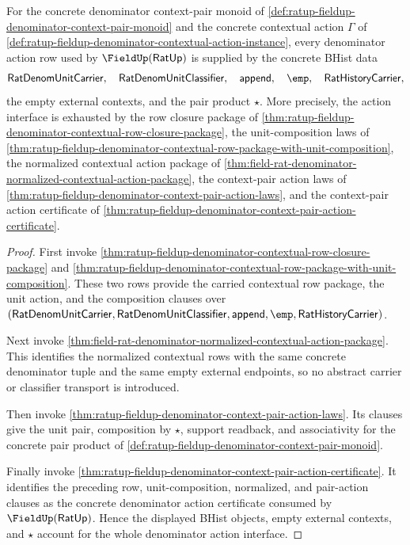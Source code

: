 \begin{theorem}
\label{thm:ratup-fieldup-denominator-context-pair-normalized-row-exhaustion}
For the concrete denominator context-pair monoid of
\autoref{def:ratup-fieldup-denominator-context-pair-monoid} and the concrete
contextual action $\Gamma$ of
\autoref{def:ratup-fieldup-denominator-contextual-action-instance}, every
denominator action row used by $\FieldUp(\mathsf{RatUp})$ is supplied by the
concrete BHist data
$$
\mathsf{RatDenomUnitCarrier},\quad
\mathsf{RatDenomUnitClassifier},\quad
\mathsf{append},\quad
\emp,\quad
\mathsf{RatHistoryCarrier},
$$
the empty external contexts, and the pair product $\star$. More precisely, the
action interface is exhausted by the row closure package of
\autoref{thm:ratup-fieldup-denominator-contextual-row-closure-package}, the
unit-composition laws of
\autoref{thm:ratup-fieldup-denominator-contextual-row-package-with-unit-composition},
the normalized contextual action package of
\autoref{thm:field-rat-denominator-normalized-contextual-action-package}, the
context-pair action laws of
\autoref{thm:ratup-fieldup-denominator-context-pair-action-laws}, and the
context-pair action certificate of
\autoref{thm:ratup-fieldup-denominator-context-pair-action-certificate}.
\end{theorem}
\begin{proof}
First invoke
\autoref{thm:ratup-fieldup-denominator-contextual-row-closure-package} and
\autoref{thm:ratup-fieldup-denominator-contextual-row-package-with-unit-composition}.
These two rows provide the carried contextual row package, the unit action, and
the composition clauses over
$(\mathsf{RatDenomUnitCarrier},\mathsf{RatDenomUnitClassifier},
\mathsf{append},\emp,\mathsf{RatHistoryCarrier})$.

Next invoke
\autoref{thm:field-rat-denominator-normalized-contextual-action-package}. This
identifies the normalized contextual rows with the same concrete denominator
tuple and the same empty external endpoints, so no abstract carrier or
classifier transport is introduced.

Then invoke
\autoref{thm:ratup-fieldup-denominator-context-pair-action-laws}. Its clauses
give the unit pair, composition by $\star$, support readback, and associativity
for the concrete pair product of
\autoref{def:ratup-fieldup-denominator-context-pair-monoid}.

Finally invoke
\autoref{thm:ratup-fieldup-denominator-context-pair-action-certificate}. It
identifies the preceding row, unit-composition, normalized, and pair-action
clauses as the concrete denominator action certificate consumed by
$\FieldUp(\mathsf{RatUp})$. Hence the displayed BHist objects, empty external
contexts, and $\star$ account for the whole denominator action interface.
\end{proof}

